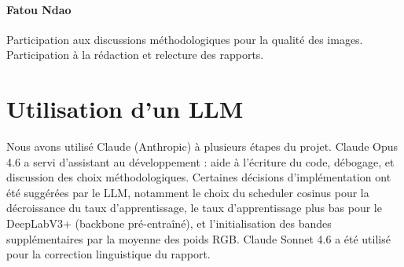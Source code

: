 \documentclass[11pt]{article}
\begin{document}
\paragraph{Fatou Ndao} Participation aux discussions méthodologiques pour la qualité des images. Participation à la rédaction et relecture
des rapports.

\section{Utilisation d'un LLM}
Nous avons utilisé Claude (Anthropic) à plusieurs étapes du projet.
Claude Opus 4.6 a servi d'assistant au développement : aide à
l'écriture du code, débogage, et discussion
des choix méthodologiques. Certaines décisions d'implémentation
ont été suggérées par le LLM, notamment le choix du scheduler cosinus
pour la décroissance du taux d'apprentissage, le taux d'apprentissage
plus bas pour le DeepLabV3+ (backbone pré-entraîné), et
l'initialisation des bandes supplémentaires par la moyenne des poids
RGB. Claude Sonnet 4.6 a été utilisé pour la correction
linguistique du rapport.
 
 


 
 
 
 
\vfill
\pagebreak
\appendix
 
 
\end{document}
